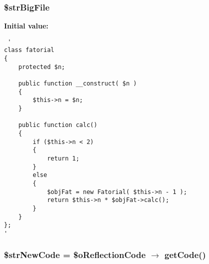 \hypertarget{code_instrumentation_2example_2test1_8php_78bb668948bf961e4e27227e71de5850}{
\subsubsection[{\$strBigFile}]{\setlength{\rightskip}{0pt plus 5cm}\$strBigFile}}
\label{code_instrumentation_2example_2test1_8php_78bb668948bf961e4e27227e71de5850}


\textbf{Initial value:}

\begin{Code}\begin{verbatim} '
class fatorial
{
    protected $n;

    public function __construct( $n )
    {
        $this->n = $n;
    }

    public function calc()
    {
        if ($this->n < 2)
        {
            return 1;
        }
        else
        {
            $objFat = new Fatorial( $this->n - 1 );
            return $this->n * $objFat->calc();
        }
    }
};
'
\end{verbatim}
\end{Code}
\hypertarget{code_instrumentation_2example_2test1_8php_882f0b62de6f379d0e0cf88ef6658601}{
\subsubsection[{\$strNewCode}]{\setlength{\rightskip}{0pt plus 5cm}\$strNewCode = \$oReflectionCode $\rightarrow$ getCode()}}
\label{code_instrumentation_2example_2test1_8php_882f0b62de6f379d0e0cf88ef6658601}


